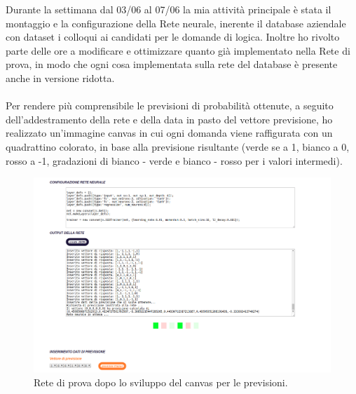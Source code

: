 Durante la settimana dal 03/06 al 07/06 la mia attivit\`a principale \`e stata il montaggio e la configurazione della Rete neurale, inerente il database aziendale con dataset i colloqui ai candidati per le domande di logica.
Inoltre ho rivolto parte delle ore a modificare e ottimizzare quanto gi\`a implementato nella Rete di prova, in modo che ogni cosa implementata sulla rete del database \`e presente anche in versione ridotta.\\\\
Per rendere pi\`u comprensibile le previsioni di probabilit\`a ottenute, a seguito dell'addestramento della rete e della data in pasto del vettore previsione, ho realizzato un'immagine canvas in cui ogni domanda viene raffigurata con un quadrattino colorato, in base alla previsione risultante (verde se a 1, bianco a 0, rosso a -1, gradazioni di bianco - verde e bianco - rosso per i valori intermedi).
\begin{figure}[H]
\centering
	\includegraphics[width=0.90\linewidth]{./image/rete_prova-canvas.png}
	\caption{Rete di prova dopo lo sviluppo del canvas per le previsioni.}
	\label{Rete di prova dopo lo sviluppo del canvas per le previsioni.}
\end{figure}

